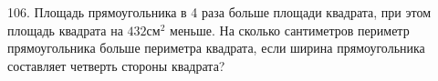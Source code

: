 106. Площадь прямоугольника в 4 раза больше площади квадрата, при этом площадь квадрата на $432\text{см}^2$ меньше. На сколько сантиметров периметр прямоугольника больше периметра квадрата, если ширина прямоугольника составляет четверть стороны квадрата?\\
